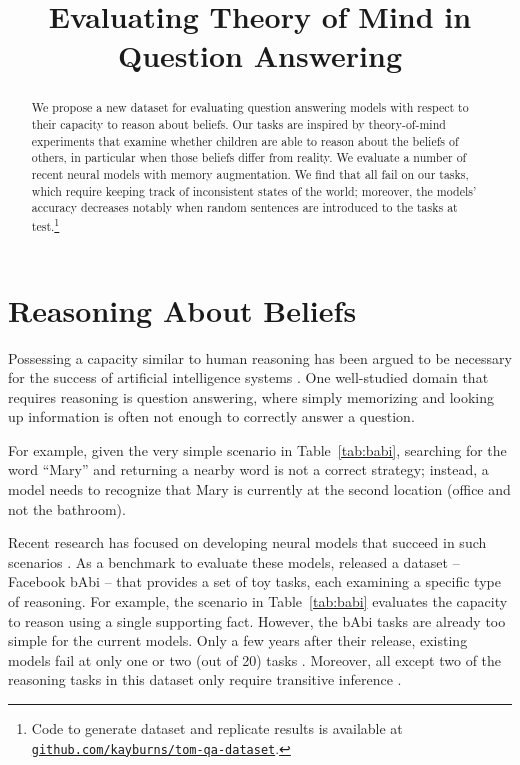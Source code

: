 \title{Evaluating Theory of Mind in Question Answering}

\begin{abstract}
We propose a new dataset for evaluating question answering models with respect to their capacity to reason about beliefs. Our tasks are inspired by theory-of-mind experiments that examine whether children are able to reason about the beliefs of others, in particular when those beliefs differ from reality. We evaluate a number of recent neural models with memory augmentation. We find that all fail on our tasks, which require keeping track of inconsistent states of the world; moreover, the models' accuracy decreases notably when random sentences are introduced to the tasks at test.\footnote{
 Code to generate dataset and replicate results is available at \href{https://github.com/kayburns/tom-qa-dataset}{\texttt{github.com/kayburns/tom-qa-dataset}}.
} 

\end{abstract}

\section{Reasoning About Beliefs}

Possessing a capacity similar to human reasoning has been argued to be necessary for the success of artificial intelligence systems
\citep[e.g. ,][]{levesque.etal.2011}. One well-studied domain that requires reasoning is question answering, where simply memorizing and looking up information is often not enough to correctly answer a question.

For example, given the very simple scenario in Table~\ref{tab:babi}, searching for the word ``Mary'' and returning a nearby word is not a correct strategy; instead, a model needs to recognize that Mary is currently at the second location (office and not the bathroom).

Recent research has focused on developing neural models that succeed in such scenarios \citep{sukhbaatar2015end,henaff2016tracking}. As a benchmark to evaluate these models, \citet{weston2016towards} released a dataset -- Facebook bAbi -- that provides a set of toy tasks, each examining a specific type of reasoning. For example, the scenario in Table~\ref{tab:babi} evaluates the capacity to reason using a single supporting fact. However, the bAbi tasks are already too simple for the current models. Only a few years after their release, existing models fail at only one or two (out of 20) tasks \citep{rae.etal.2016,santoro.etal.2017}. Moreover, all except two of the reasoning tasks in this dataset only require transitive inference \citep{Lee2015ReasoningIV}.

